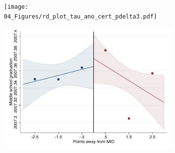 \documentclass[oneside,11pt]{article}
\begin{document}
\begin{figure}[H]
\begin{center}
    \begin{subfigure}{0.475\textwidth}
        \centering
        \texttt{[image: 04\_Figures/rd\_plot\_tau\_ano\_cert\_pdelta3.pdf]}
    \end{subfigure}
    \begin{subfigure}{0.475\textwidth}
        \centering
        \includegraphics[width=\textwidth]{04_Figures/rd_plot_mid_ano_cert_pdelta3.pdf}
    \end{subfigure}


\end{center}
\end{figure}
\end{document}
